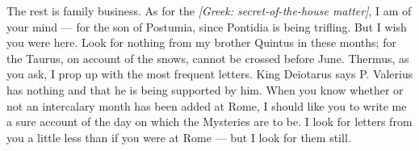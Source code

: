  The rest is family business. As for the \textit{[Greek: secret-of-the-house matter]}, I am of your mind --- for the son of Postumia, since Pontidia is being trifling. But I wish you were here. Look for nothing from my brother Quintus in these months; for the Taurus, on account of the snows, cannot be crossed before June. Thermus, as you ask, I prop up with the most frequent letters. King Deiotarus says P. Valerius has nothing and that he is being supported by him. When you know whether or not an intercalary month has been added at Rome, I should like you to write me a sure account of the day on which the Mysteries are to be. I look for letters from you a little less than if you were at Rome --- but I look for them still.
